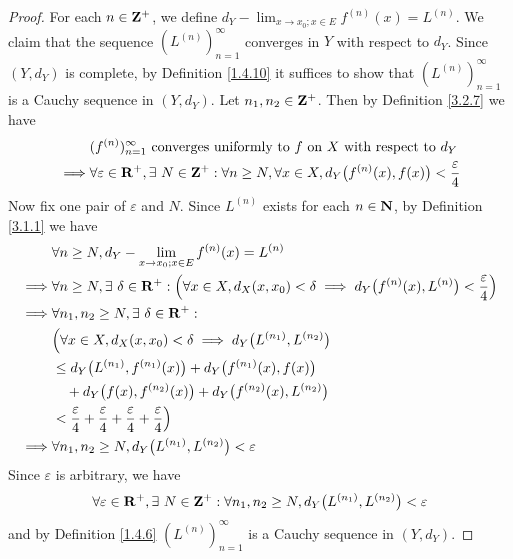\begin{proof}
    For each \(n \in \mathbf{Z}^+\), we define \(d_Y - \lim_{x \to x_0 ; x \in E} f^{(n)}(x) = L^{(n)}\).
    We claim that the sequence \((L^{(n)})_{n = 1}^\infty\) converges in \(Y\) with respect to \(d_Y\).
    Since \((Y, d_Y)\) is complete, by Definition \ref{1.4.10} it suffices to show that \((L^{(n)})_{n = 1}^\infty\) is a Cauchy sequence in \((Y, d_Y)\).
    Let \(n_1, n_2 \in \mathbf{Z}^+\).
    Then by Definition \ref{3.2.7} we have
    \begin{align*}
                 & (f^{(n)})_{n = 1}^\infty \text{ converges uniformly to } f \text{ on } X \text{ with respect to } d_Y                                        \\
        \implies & \forall \varepsilon \in \mathbf{R}^+, \exists\ N \in \mathbf{Z}^+ : \forall n \geq N, \forall x \in X, d_Y\big(f^{(n)}(x), f(x)\big) < \frac{\varepsilon}{4}
    \end{align*}
    Now fix one pair of \(\varepsilon\) and \(N\).
    Since \(L^{(n)}\) exists for each \(n \in \mathbf{N}\), by Definition \ref{3.1.1} we have
    \begin{align*}
                 & \forall n \geq N, d_Y - \lim_{x \to x_0 ; x \in E} f^{(n)}(x) = L^{(n)}                                                                                        \\
        \implies & \forall n \geq N, \exists\ \delta \in \mathbf{R}^+ : \Big(\forall x \in X, d_X(x, x_0) < \delta \implies d_Y\big(f^{(n)}(x), L^{(n)}\big) < \frac{\varepsilon}{4}\Big) \\
        \implies & \forall n_1, n_2 \geq N, \exists\ \delta \in \mathbf{R}^+ :                                                                                                            \\
                 & \Big(\forall x \in X, d_X(x, x_0) < \delta \implies d_Y\big(L^{(n_1)}, L^{(n_2)}\big)                                                                          \\
                 & \leq d_Y\big(L^{(n_1)}, f^{(n_1)}(x)\big) + d_Y\big(f^{(n_1)}(x), f(x)\big)                                                                                    \\
                 & \quad + d_Y\big(f(x), f^{(n_2)}(x)\big) + d_Y\big(f^{(n_2)}(x), L^{(n_2)}\big)                                                                                 \\
                 & < \frac{\varepsilon}{4} + \frac{\varepsilon}{4} + \frac{\varepsilon}{4} + \frac{\varepsilon}{4}\Big)                                                           \\
        \implies & \forall n_1, n_2 \geq N, d_Y\big(L^{(n_1)}, L^{(n_2)}\big) < \varepsilon
    \end{align*}
    Since \(\varepsilon\) is arbitrary, we have
    \[
        \forall \varepsilon \in \mathbf{R}^+, \exists\ N \in \mathbf{Z}^+ : \forall n_1, n_2 \geq N, d_Y\big(L^{(n_1)}, L^{(n_2)}\big) < \varepsilon
    \]
    and by Definition \ref{1.4.6} \((L^{(n)})_{n = 1}^\infty\) is a Cauchy sequence in \((Y, d_Y)\).


\end{proof}
